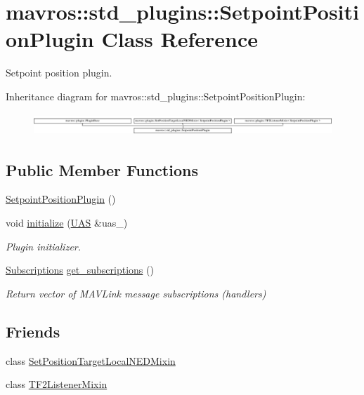 \hypertarget{classmavros_1_1std__plugins_1_1SetpointPositionPlugin}{}\section{mavros\+::std\+\_\+plugins\+::Setpoint\+Position\+Plugin Class Reference}
\label{classmavros_1_1std__plugins_1_1SetpointPositionPlugin}


Setpoint position plugin.  


Inheritance diagram for mavros\+::std\+\_\+plugins\+::Setpoint\+Position\+Plugin\+:\begin{figure}[H]
\begin{center}
\leavevmode
\includegraphics[height=0.848485cm]{classmavros_1_1std__plugins_1_1SetpointPositionPlugin}
\end{center}
\end{figure}
\subsection*{Public Member Functions}
\begin{DoxyCompactItemize}
\item 
\mbox{\hyperlink{group__plugin_ga79d0cd0249bfbbcb1d98e6e938a95f5a}{Setpoint\+Position\+Plugin}} ()
\item 
void \mbox{\hyperlink{group__plugin_ga2bc831f4a3bdab8f284ead3bbc761181}{initialize}} (\mbox{\hyperlink{classmavros_1_1UAS}{U\+AS}} \&uas\+\_\+)
\begin{DoxyCompactList}\small\item\em Plugin initializer. \end{DoxyCompactList}\item 
\mbox{\hyperlink{group__plugin_ga8967d61fc77040e0c3ea5a4585d62a09}{Subscriptions}} \mbox{\hyperlink{group__plugin_ga99aff69e854142f0373ec4acb5ac726d}{get\+\_\+subscriptions}} ()
\begin{DoxyCompactList}\small\item\em Return vector of M\+A\+V\+Link message subscriptions (handlers) \end{DoxyCompactList}\end{DoxyCompactItemize}
\subsection*{Friends}
\begin{DoxyCompactItemize}
\item 
class \mbox{\hyperlink{group__plugin_gac6cc7d4f0f89ffc59d03574a47983861}{Set\+Position\+Target\+Local\+N\+E\+D\+Mixin}}
\item 
class \mbox{\hyperlink{group__plugin_ga0eb3bbd8737231d2db969230d1d8b54b}{T\+F2\+Listener\+Mixin}}
\end{DoxyCompactItemize}
